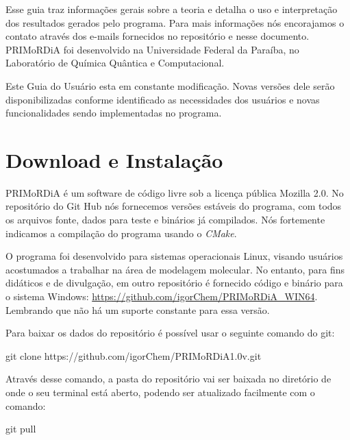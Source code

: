 \documentclass[a4paper,11pt]{refart}
\begin{document}
Esse guia traz informações gerais sobre a teoria e detalha o uso e interpretação dos resultados gerados pelo programa. Para mais informações nós encorajamos o contato através dos e-mails fornecidos no repositório e nesse documento. PRIMoRDiA foi desenvolvido na Universidade Federal da Paraíba, no Laboratório de Química Quântica e Computacional.

Este Guia do Usuário esta em constante modificação. Novas versões dele serão disponibilizadas conforme identificado as necessidades dos usuários e novas funcionalidades sendo implementadas no programa.

\section{Download e Instalação}

PRIMoRDiA é um software de código livre sob a licença pública Mozilla 2.0. No repositório do Git Hub nós fornecemos versões estáveis do programa, com todos os arquivos fonte, dados para teste e binários já compilados. Nós fortemente indicamos a compilação do programa usando o \emph{CMake}. 

O programa foi desenvolvido para sistemas operacionais Linux, visando usuários acostumados a trabalhar na área de modelagem molecular. No entanto, para fins didáticos e de divulgação, em outro repositório é fornecido código e binário para o sistema Windows: \url{https://github.com/igorChem/PRIMoRDiA_WIN64}. Lembrando que não há um suporte constante para essa versão.

Para baixar os dados do repositório é possível usar o seguinte comando do git:

\hspace*{-\leftmarginwidth}
\begin{minipage}{\fullwidth}
	\begin{commandshell}git clone https://github.com/igorChem/PRIMoRDiA1.0v.git\end{commandshell}
\end{minipage}

Através desse comando, a pasta do repositório vai ser baixada no diretório de onde o seu terminal está aberto, podendo ser atualizado facilmente com o comando: 

\hspace*{-\leftmarginwidth}
\begin{minipage}{\fullwidth}
	\begin{commandshell}git pull\end{commandshell}
\end{minipage}
\end{document}
